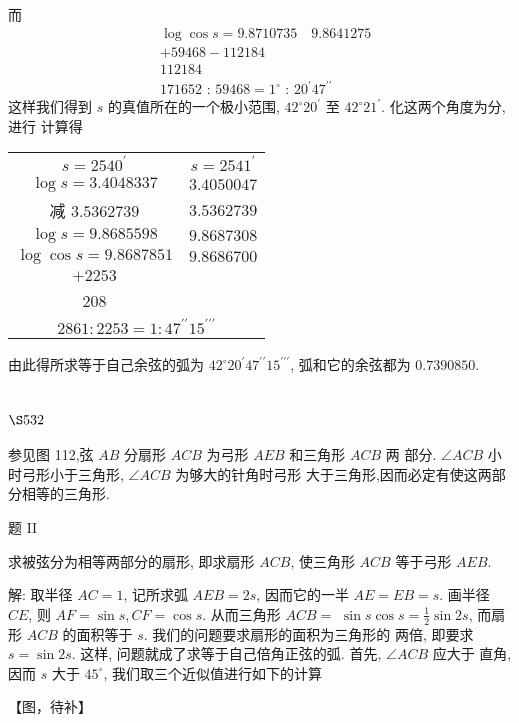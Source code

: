 而
\[
\begin{aligned}
& \log \cos s=9.8710735 \quad 9.8641275 \\
& +59468-112184 \\
& 112184 \\
& 171652 \text { : } 59468=1^{\circ} \text { : } 20^{\prime} 47^{\prime \prime}
\end{aligned}
\]
这样我们得到 $s$ 的真值所在的一个极小范围, $42^{\circ} 20^{\prime}$ 至 $42^{\circ} 21^{\prime}$. 化这两个角度为分, 进行 计算得

\begin{tabular}{cc}
$s=2540^{\prime}$ & $s=2541^{\prime}$ \\
$\log s=3.4048337$ & $3.4050047$ \\
减 $3.5362739$ & $3.5362739$ \\
\hline $\log s=9.8685598$ & $9.8687308$ \\
$\log \cos s=9.8687851$ & $9.8686700$ \\
\hline$+2253$ & \\
208 & \\
\hline \multicolumn{2}{c}{$2861: 2253=1: 47^{\prime \prime} 15^{\prime \prime \prime}$}
\end{tabular}

由此得所求等于自己余弦的弧为 $42^{\circ} 20^{\prime} 47^{\prime \prime} 15^{\prime \prime \prime}$, 弧和它的余弦都为 $0.7390850$.

\section{$\S 532$}

参见图 112,弦 $A B$ 分扇形 $A C B$ 为弓形 $A E B$ 和三角形 $A C B$ 两 部分. $\angle A C B$ 小时弓形小于三角形, $\angle A C B$ 为够大的针角时弓形 大于三角形,因而必定有使这两部分相等的三角形.

题 II

求被弦分为相等两部分的扇形, 即求扇形 $A C B$, 使三角形 $A C B$ 等于弓形 $A E B$.

解: 取半径 $A C=1$, 记所求弧 $A E B=2 s$, 因而它的一半 $A E=E B=s$. 画半径 $C E$, 则 $A F=\sin s, C F=\cos s$. 从而三角形 $A C B=$ $\sin s \cos s=\frac{1}{2} \sin 2 s$, 而扇形 $A C B$ 的面积等于 $s$. 我们的问题要求扇形的面积为三角形的 两倍, 即要求 $s=\sin 2 s$. 这样, 问题就成了求等于自己倍角正弦的弧. 首先, $\angle A C B$ 应大于 直角, 因而 $s$ 大于 $45^{\circ}$, 我们取三个近似值进行如下的计算


【图，待补】

